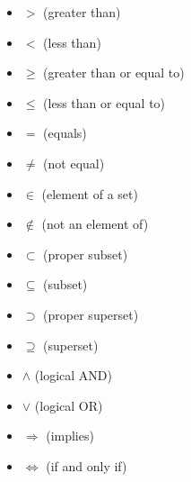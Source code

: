 \begin{itemize}
	\item $>$ \quad (greater than)

	\item $<$ \quad (less than)

	\item $\geq$ \quad (greater than or equal to)

	\item $\leq$ \quad (less than or equal to)

	\item $=$ \quad (equals)

	\item $\neq$ \quad (not equal)

	\item $\in$ \quad (element of a set)

	\item $\notin$ \quad (not an element of)

	\item $\subset$ \quad (proper subset)

	\item $\subseteq$ \quad (subset)

	\item $\supset$ \quad (proper superset)

	\item $\supseteq$ \quad (superset)

	\item $\land$ \quad (logical AND)

	\item $\lor$ \quad (logical OR)

	\item $\Rightarrow$ \quad (implies)

	\item $\Leftrightarrow$ \quad (if and only if)
\end{itemize}

\newpage